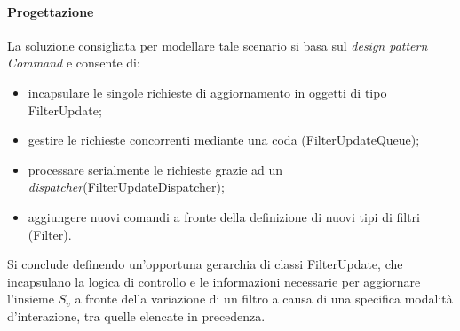 \pagebreak
\paragraph{Progettazione}
La soluzione consigliata per modellare tale scenario si basa sul \textit{design pattern} \textit{Command} e consente di:
\begin{itemize}
  \item incapsulare le singole richieste di aggiornamento in oggetti di tipo \textsf{FilterUpdate};
  \item gestire le richieste concorrenti mediante una coda \linebreak(\textsf{FilterUpdateQueue});
  \item processare serialmente le richieste grazie ad un \textit{dispatcher}\linebreak (\textsf{FilterUpdateDispatcher});
  \item aggiungere nuovi comandi a fronte della definizione di nuovi tipi di filtri (\textsf{Filter}).
\end{itemize}

Si conclude definendo un'opportuna gerarchia di classi \textsf{FilterUpdate}, che incapsulano la logica di controllo e le informazioni necessarie per aggiornare l'insieme $S_v$ a fronte della variazione di un filtro a causa di una specifica modalità d'interazione, tra quelle elencate in precedenza.